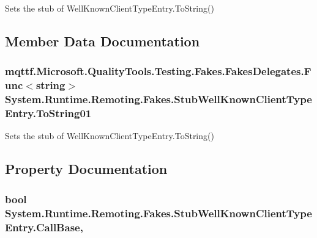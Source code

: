 Sets the stub of Well\-Known\-Client\-Type\-Entry.\-To\-String()



\subsection{Member Data Documentation}
\hypertarget{class_system_1_1_runtime_1_1_remoting_1_1_fakes_1_1_stub_well_known_client_type_entry_a6ce3942895c5dc39ab9a1947bd1183b0}{
\subsubsection[{To\-String01}]{\setlength{\rightskip}{0pt plus 5cm}mqttf.\-Microsoft.\-Quality\-Tools.\-Testing.\-Fakes.\-Fakes\-Delegates.\-Func$<$string$>$ System.\-Runtime.\-Remoting.\-Fakes.\-Stub\-Well\-Known\-Client\-Type\-Entry.\-To\-String01}}\label{class_system_1_1_runtime_1_1_remoting_1_1_fakes_1_1_stub_well_known_client_type_entry_a6ce3942895c5dc39ab9a1947bd1183b0}


Sets the stub of Well\-Known\-Client\-Type\-Entry.\-To\-String()



\subsection{Property Documentation}
\hypertarget{class_system_1_1_runtime_1_1_remoting_1_1_fakes_1_1_stub_well_known_client_type_entry_af745a7b66326b54733b6b9fd97b9f7ad}{
\subsubsection[{Call\-Base}]{\setlength{\rightskip}{0pt plus 5cm}bool System.\-Runtime.\-Remoting.\-Fakes.\-Stub\-Well\-Known\-Client\-Type\-Entry.\-Call\-Base\hspace{0.3cm}{\ttfamily [get]}, {\ttfamily [set]}}}\label{class_system_1_1_runtime_1_1_remoting_1_1_fakes_1_1_stub_well_known_client_type_entry_af745a7b66326b54733b6b9fd97b9f7ad}


